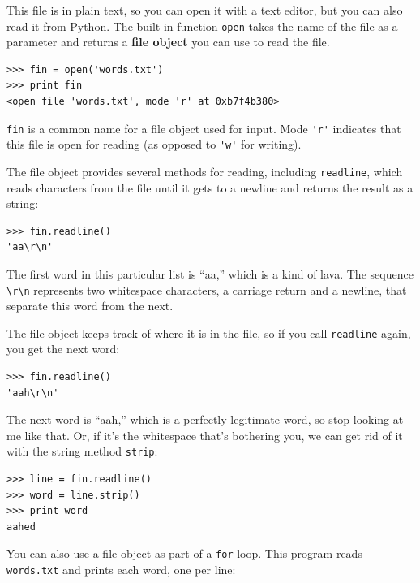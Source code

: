 \documentclass[10pt]{book}
\begin{document}
This file is in plain text, so you can open it with a text
editor, but you can also read it from Python.  The built-in
function {\tt open} takes the name of the file as a parameter
and returns a {\bf file object} you can use to read the file.


\beforeverb
\begin{verbatim}
>>> fin = open('words.txt')
>>> print fin
<open file 'words.txt', mode 'r' at 0xb7f4b380>
\end{verbatim}
\afterverb
%
{\tt fin} is a common name for a file object used for
input.  Mode \verb"'r'" indicates that this file is open for
reading (as opposed to \verb"'w'" for writing).


The file object provides several methods for reading, including
{\tt readline}, which reads characters from the file
until it gets to a newline and returns the result as a
string:

\beforeverb
\begin{verbatim}
>>> fin.readline()
'aa\r\n'
\end{verbatim}
\afterverb
%
The first word in this particular list is ``aa,'' which is a kind of
lava.  The sequence \verb"\r\n" represents two whitespace characters,
a carriage return and a newline, that separate this word from the
next.

The file object keeps track of where it is in the file, so
if you call {\tt readline} again, you get the next word:

\beforeverb
\begin{verbatim}
>>> fin.readline()
'aah\r\n'
\end{verbatim}
\afterverb
%
The next word is ``aah,'' which is a perfectly legitimate
word, so stop looking at me like that.
Or, if it's the whitespace that's bothering you,
we can get rid of it with the string method {\tt strip}:


\beforeverb
\begin{verbatim}
>>> line = fin.readline()
>>> word = line.strip()
>>> print word
aahed
\end{verbatim}
\afterverb
%
You can also use a file object as part of a {\tt for} loop.
This program reads {\tt words.txt} and prints each word, one
per line:
\end{document}
